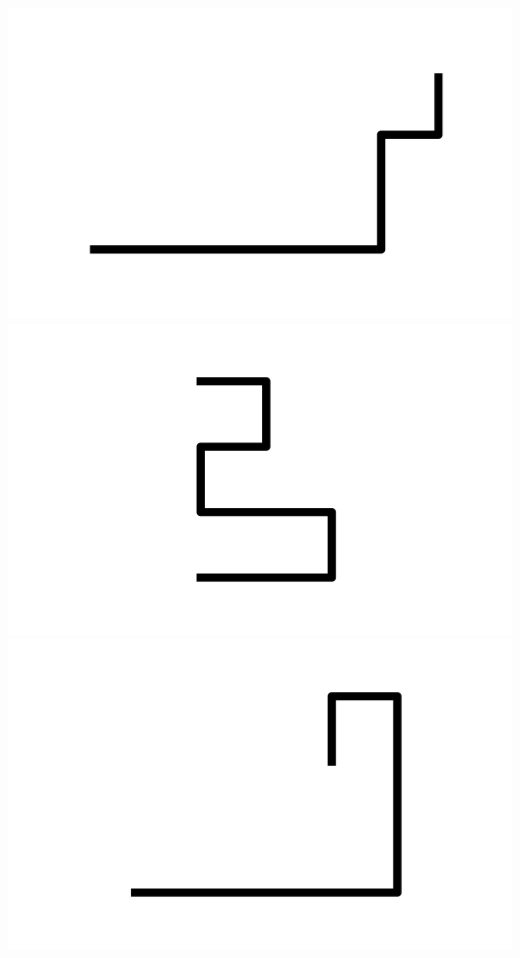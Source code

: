 \documentclass[]{report}
\begin{document}
\includegraphics[scale=.1]{pictures/21/state_cluster_shapes_394.pdf} 
\includegraphics[scale=.1]{pictures/21/state_cluster_shapes_395.pdf} 
\includegraphics[scale=.1]{pictures/21/state_cluster_shapes_396.pdf} 
\end{document}
